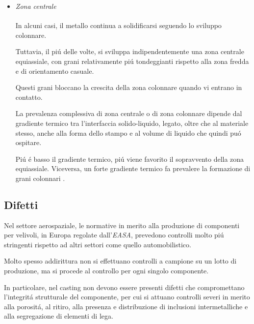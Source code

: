 \documentclass{article}
\begin{document}
\begin{itemize}
                    \item \textit{Zona centrale} \\ \\ 
                        In alcuni casi, il metallo continua a solidificarsi seguendo lo sviluppo colonnare.

                        Tuttavia, il piú delle volte, si sviluppa indipendentemente una zona centrale equiassiale,
                        con grani relativamente piú tondeggianti rispetto alla zona fredda e di orientamento casuale.

                        Questi grani bloccano la crescita della zona colonnare quando vi entrano in contatto.

                        La prevalenza complessiva di zona centrale o di zona colonnare dipende dal gradiente termico tra l'interfaccia 
                        solido-liquido, legato, oltre che al materiale stesso, anche alla forma dello stampo e al volume
                        di liquido che quindi puó ospitare.

                        Piú é basso il gradiente termico, piú viene favorito il sopravvento della zona equiassiale. Viceversa, 
                        un forte gradiente termico fa prevalere la formazione di grani colonnari \autocite{Mouritz}.
                \end{itemize}

            \clearpage 



        \subsection{Difetti\label{Casting_difetti}}

        Nel settore aerospaziale, le normative in merito alla produzione di componenti per velivoli, in Europa
        regolate dall'\textit{EASA}, prevedono controlli molto piú stringenti rispetto ad altri settori 
        come quello automobilistico. 

        Molto spesso addirittura non si effettuano controlli a campione su un lotto di produzione, ma si 
        procede al controllo per ogni singolo componente. 

        In particolare, nel casting non devono essere presenti difetti che compromettano l'integritá
        strutturale del componente, per cui si attuano controlli severi in merito alla porositá, al ritiro, 
        alla presenza e distribuzione di inclusioni intermetalliche e alla segregazione di elementi di lega.
 
\end{document}
